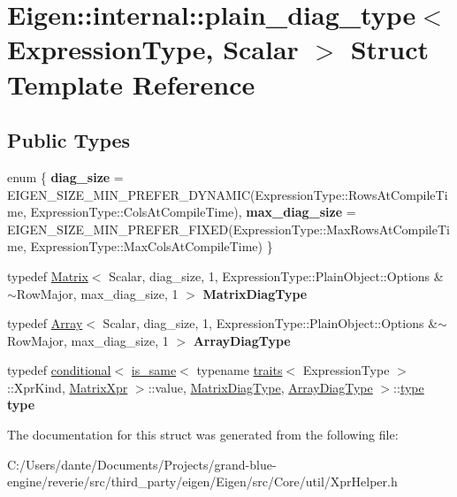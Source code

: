 \hypertarget{struct_eigen_1_1internal_1_1plain__diag__type}{}\section{Eigen\+::internal\+::plain\+\_\+diag\+\_\+type$<$ Expression\+Type, Scalar $>$ Struct Template Reference}
\label{struct_eigen_1_1internal_1_1plain__diag__type}
\subsection*{Public Types}
\begin{DoxyCompactItemize}
\item 
\mbox{\label{struct_eigen_1_1internal_1_1plain__diag__type_a0d2e7887aa93fc54897262684c2653f0}} 
enum \{ {\bfseries diag\+\_\+size} = E\+I\+G\+E\+N\+\_\+\+S\+I\+Z\+E\+\_\+\+M\+I\+N\+\_\+\+P\+R\+E\+F\+E\+R\+\_\+\+D\+Y\+N\+A\+M\+IC(Expression\+Type\+::Rows\+At\+Compile\+Time, Expression\+Type\+::Cols\+At\+Compile\+Time), 
{\bfseries max\+\_\+diag\+\_\+size} = E\+I\+G\+E\+N\+\_\+\+S\+I\+Z\+E\+\_\+\+M\+I\+N\+\_\+\+P\+R\+E\+F\+E\+R\+\_\+\+F\+I\+X\+ED(Expression\+Type\+::Max\+Rows\+At\+Compile\+Time, Expression\+Type\+::Max\+Cols\+At\+Compile\+Time)
 \}
\item 
\mbox{\label{struct_eigen_1_1internal_1_1plain__diag__type_a69632fbb83643a8b45c7d08d4b2d7c77}} 
typedef \mbox{\hyperlink{class_eigen_1_1_matrix}{Matrix}}$<$ Scalar, diag\+\_\+size, 1, Expression\+Type\+::\+Plain\+Object\+::\+Options \&$\sim$Row\+Major, max\+\_\+diag\+\_\+size, 1 $>$ {\bfseries Matrix\+Diag\+Type}
\item 
\mbox{\label{struct_eigen_1_1internal_1_1plain__diag__type_a7e0e180b02fc82020caeccc5ed0987bd}} 
typedef \mbox{\hyperlink{class_eigen_1_1_array}{Array}}$<$ Scalar, diag\+\_\+size, 1, Expression\+Type\+::\+Plain\+Object\+::\+Options \&$\sim$Row\+Major, max\+\_\+diag\+\_\+size, 1 $>$ {\bfseries Array\+Diag\+Type}
\item 
\mbox{\label{struct_eigen_1_1internal_1_1plain__diag__type_af32705fa775bbb35d9647a6d1419144e}} 
typedef \mbox{\hyperlink{struct_eigen_1_1internal_1_1conditional}{conditional}}$<$ \mbox{\hyperlink{struct_eigen_1_1internal_1_1is__same}{is\+\_\+same}}$<$ typename \mbox{\hyperlink{struct_eigen_1_1internal_1_1traits}{traits}}$<$ Expression\+Type $>$\+::Xpr\+Kind, \mbox{\hyperlink{struct_eigen_1_1_matrix_xpr}{Matrix\+Xpr}} $>$\+::value, \mbox{\hyperlink{class_eigen_1_1_matrix}{Matrix\+Diag\+Type}}, \mbox{\hyperlink{class_eigen_1_1_array}{Array\+Diag\+Type}} $>$\+::\mbox{\hyperlink{struct_eigen_1_1internal_1_1true__type}{type}} {\bfseries type}
\end{DoxyCompactItemize}


The documentation for this struct was generated from the following file\+:\begin{DoxyCompactItemize}
\item 
C\+:/\+Users/dante/\+Documents/\+Projects/grand-\/blue-\/engine/reverie/src/third\+\_\+party/eigen/\+Eigen/src/\+Core/util/Xpr\+Helper.\+h\end{DoxyCompactItemize}
